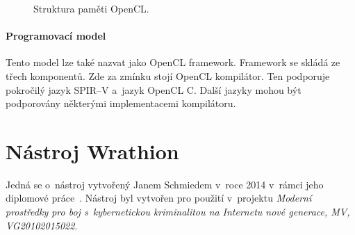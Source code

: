 \begin{figure}[ht]
    \begin{center}
    \end{center}
    \caption{Struktura paměti OpenCL. \cite{Khronos:2015}}
    \label{memory}
\end{figure}
\subsubsection{Programovací model}
Tento model lze také nazvat jako OpenCL framework. Framework se skládá ze třech komponentů. Zde za
zmínku stojí OpenCL kompilátor. Ten podporuje pokročilý jazyk SPIR--V a~jazyk OpenCL C. Další
jazyky mohou být podporovány některými implementacemi kompilátoru.


\chapter{Nástroj Wrathion}
\label{ch:wrathion}
Jedná se o~nástroj vytvořený Janem Schmiedem v~roce 2014 v~rámci jeho diplomové
\linebreak práce~\cite{Schmied}. Nástroj byl vytvořen pro použití v~projektu {\it Moderní
prostředky pro boj s~kybernetickou kriminalitou na Internetu nové generace, MV, VG20102015022}.
